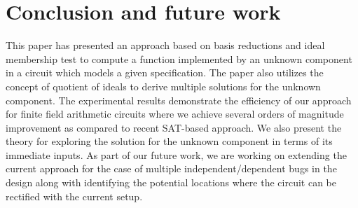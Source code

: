 \section{Conclusion and future work}
This paper has presented an approach based on \Grobner basis reductions and ideal
membership test to compute a function implemented by an unknown component in a circuit which models
a given specification. 
The paper also utilizes the concept of quotient of ideals to derive multiple solutions
for the unknown component. The experimental results demonstrate the efficiency of our approach 
for finite field arithmetic circuits where we achieve several orders of 
magnitude improvement as compared to recent SAT-based approach. 
We also present the theory for exploring the solution for the unknown 
component in terms of its immediate inputs.  
As part of our future work, we are working on extending the current approach  
for the case of multiple independent/dependent bugs in the design along
with identifying the potential locations where the circuit can be rectified 
with the current setup.  
